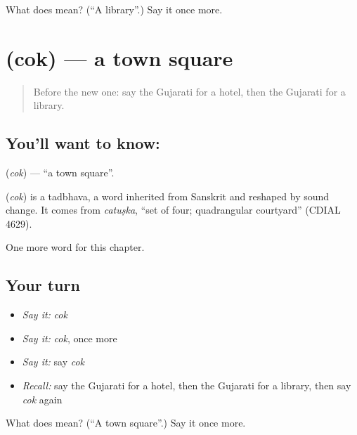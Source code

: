 \begin{tcolorbox}[breakable,colback=teal!4,colframe=teal!35!black,title={Before you move on}]
What does  mean? (\textquotedblleft{}A library\textquotedblright{}.) Say it once more.
\end{tcolorbox}
\section[\texorpdfstring{\gu{ચોક} (cok)}{ચોક (cok)}]{ (cok) — a town square}

\label{lesson:GU-C128-cok}



\begin{quote}
Before the new one: say the Gujarati for a hotel, then the Gujarati for a library.
\end{quote}

\subsection*{You'll want to know: }
\textbf{} (\emph{cok}) — \textquotedblleft{}a town square\textquotedblright{}.

\begin{cousinweb}
\textbf{} (\emph{cok}) is a tadbhava, a word inherited from Sanskrit and reshaped by sound change. It comes from \emph{catuṣka}, \textquotedblleft{}set of four; quadrangular courtyard\textquotedblright{} (CDIAL 4629).
\end{cousinweb}

\begin{grammarlens}[title={What you've built}]
One more word for this chapter.
\end{grammarlens}

\subsection*{Your turn}
\begin{itemize}
\raggedright
  \item \emph{Say it:} \emph{cok}
  \item \emph{Say it:} \emph{cok}, once more
  \item \emph{Say it:} say \emph{cok}
  \item \emph{Recall:} say the Gujarati for a hotel, then the Gujarati for a library, then say \emph{cok} again
\end{itemize}

\begin{tcolorbox}[breakable,colback=teal!4,colframe=teal!35!black,title={Before you move on}]
What does  mean? (\textquotedblleft{}A town square\textquotedblright{}.) Say it once more.
\end{tcolorbox}
